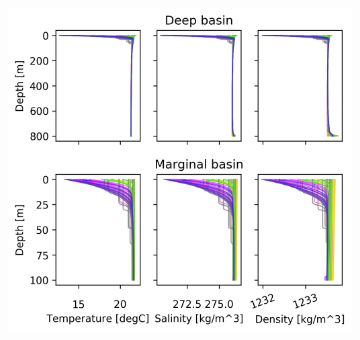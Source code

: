 \documentclass[twocolumn]{article}
\begin{document}
\begin{figure}
\begin{subfigure}[h]{0.7\textwidth}
\centering
\includegraphics[width=\textwidth,keepaspectratio]{summer_mixing.png}
\end{subfigure}\hfill
\begin{subfigure}[h]{0.20\textwidth}
\centering

\end{subfigure}
\end{figure}
\end{document}
